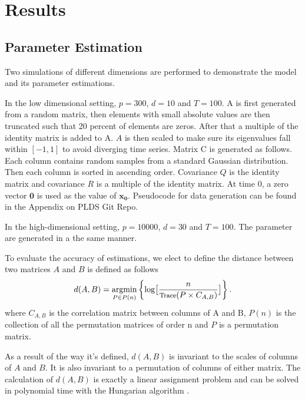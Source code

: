 \documentclass[fleqn,12pt]{article}
\newcommand{\argmin}{\operatornamewithlimits{argmin}}
\begin{document}
\section{Results}
\subsection{Parameter Estimation}
\label{sec:lowdsim}
Two simulations of different dimensions are performed to demonstrate the model and its parameter estimations.

In the low dimensional setting, $p = 300$, $d = 10$ and $T = 100$. A is first generated from a random matrix, then elements with small absolute values are then truncated such that 20 percent of elements are zeros. After that a multiple of the identity matrix is added to A. $A$ is then scaled to make sure its eigenvalues fall within $[-1,1]$ to avoid diverging time series. Matrix C is generated as follows. Each column contains random samples from a standard Gaussian distribution. Then each column is sorted in ascending order. Covariance $Q$ is the identity matrix and covariance $R$ is a multiple of the identity matrix. At time 0, a zero vector $\mathbf{0}$ is used as the value of $\mathbf{x_0}$. Pseudocode for data generation can be found in the Appendix on PLDS Git Repo.

In the high-dimensional setting, $p = 10000$, $d = 30$ and $T = 100$. The parameter are generated in a the same manner.

To evaluate the accuracy of estimations, we elect to define the distance between two matrices $A$ and $B$ is defined as follows
\begin{equation}\label{eq:distance}
d(A,B) = \argmin_{P\in P(n)}\left\{\log\bigl[\frac{n}{\text{\footnotesize Trace}(P\times C_{A,B})}\bigr]\right\}.
\end{equation}
where $C_{A,B}$ is the correlation matrix between columns of A and B, $P(n)$ is the collection of all the permutation matrices of order n and $P$ is a permutation matrix.

As a result of the way it's defined, $d(A,B)$ is invariant to the scales of columns of $A$ and $B$. It is also invariant to a permutation of columns of either matrix. The calculation of $d(A,B)$ is exactly a linear assignment problem and can be solved in polynomial time with the Hungarian algorithm \citep{kuhn1955hungarian}.
\end{document}
